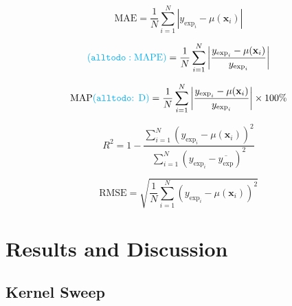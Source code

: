 \documentclass[journal=jacsat,manuscript=article]{achemso}
\newcommand{\alltodo}[1]{{\color{Cyan} (\texttt{alltodo}: #1)}}
\begin{document}
\begin{equation}
    \text{MAE} = \frac{1}{N} \sum_{i=1}^{N} \left| y_{\text{exp}_i} - \mu(\mathbf{x}_i) \right|
    \label{eq:MAE}
\end{equation}

\begin{equation}
    \alltodo{\text{MAPE}} = \frac{1}{N} \sum_{i=1}^{N} \left| \frac{y_{\text{exp}_i} - \mu(\mathbf{x}_i)}{y_{\text{exp}_i}} \right|
    \label{eq:MAPE}
\end{equation}

\begin{equation}
    \text{MAP\alltodo{D}} = \frac{1}{N} \sum_{i=1}^{N} \left| \frac{y_{\text{exp}_i} - \mu(\mathbf{x}_i)}{y_{\text{exp}_i}} \right| \times 100\%
    \label{eq:MAPD}
\end{equation}

\begin{equation}
    R^2 = 1 - \frac{\sum_{i=1}^{N} \left( y_{\text{exp}_i} - \mu(\mathbf{x}_i) \right)^2}{\sum_{i=1}^{N} \left( y_{\text{exp}_i} - \overline{y_{\text{exp}}} \right)^2}
    \label{eq:COD}
\end{equation}

\begin{equation}
    \text{RMSE} = \sqrt{\frac{1}{N} \sum_{i=1}^{N} \left( y_{\text{exp}_i} - \mu(\mathbf{x}_i) \right)^2}
    \label{eq:RMSE}
\end{equation}

\section{Results and Discussion}


\subsection{Kernel Sweep} 
\label{sec:kern_sweep}
\end{document}
